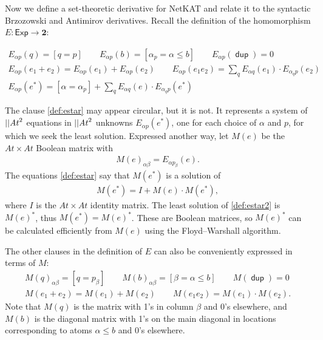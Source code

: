 \documentclass{article}
\newcommand\At{\ensuremath{\mathit{At}}}
\newcommand\ssum{\mathop{\textstyle\sum}}
\newcommand\pdup{\mathop{\mathsf{dup}}}
\newcommand\Two{\mathbf{2}}
\newcommand\Exp{\mathsf{Exp}}
\newcommand\bval[1]{[#1]}
\renewcommand\star{^{\textstyle *}}
\begin{document}
Now we define a set-theoretic derivative for NetKAT and relate it to the syntactic Brzozowski and Antimirov derivatives. Recall the definition of the homomorphism $E:\Exp\to\Two$:

\begin{gather}
E_{\alpha p}(q) = \bval{q = p} \qquad
E_{\alpha p}(b) = \bval{\alpha_p=\alpha\leq b} \qquad
E_{\alpha p}(\pdup) = 0\nonumber\\
E_{\alpha p}(e_1+e_2) = E_{\alpha p}(e_1)+E_{\alpha p}(e_2) \qquad
E_{\alpha p}(e_1e_2) = \ssum_{q} E_{\alpha q}(e_1)\cdot E_{\alpha_q p}(e_2)\nonumber\\
E_{\alpha p}(e\star) = \bval{\alpha=\alpha_p} + \ssum_{q} E_{\alpha q}(e)\cdot E_{\alpha_q p}(e\star)\label{def:estar}
\end{gather}

The clause \eqref{def:estar} may appear circular, but it is not. It represents a system of $\len\At^2$ equations in $\len\At^2$ unknowns $E_{\alpha p}(e\star)$, one for each choice of $\alpha$ and $p$, for which we seek the least solution. Expressed another way, let $M(e)$ be the $\At\times\At$ Boolean matrix with 
\begin{gather}
M(e)_{\alpha\beta} = E_{\alpha p_\beta}(e).\label{eq:estar3}
\end{gather}
The equations \eqref{def:estar} say that $M(e\star)$ is a solution of
\begin{gather}
M(e\star) = I + M(e)\cdot M(e\star),\label{def:estar2} 
\end{gather}
where $I$ is the $\At\times\At$ identity matrix. The least solution of \eqref{def:estar2} is $M(e)\star$, thus $M(e\star)=M(e)\star$. These are Boolean matrices, so $M(e)\star$ can be calculated efficiently from $M(e)$ using the Floyd--Warshall algorithm.

The other clauses in the definition of $E$ can also be conveniently expressed in terms of $M$:
\begin{gather*}
M(q)_{\alpha\beta} = \bval{q = p_\beta} \qquad
M(b)_{\alpha\beta} = \bval{\beta=\alpha\leq b} \qquad
M(\pdup) = 0\\
M(e_1+e_2) = M(e_1)+M(e_2) \qquad
M(e_1e_2) = M(e_1)\cdot M(e_2).
\end{gather*}
Note that $M(q)$ is the matrix with 1's in column $\beta$ and 0's elsewhere, and $M(b)$ is the diagonal matrix with 1's on the main diagonal in locations corresponding to atoms $\alpha\leq b$ and 0's elsewhere.
\end{document}
